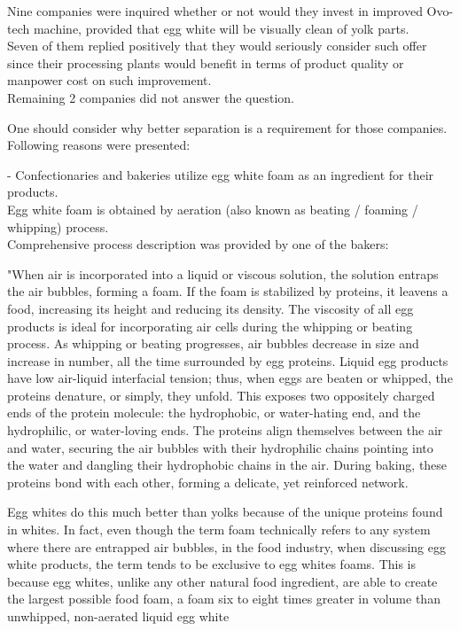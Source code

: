 \documentclass[12pt,twoside,a4paper]{article}
\begin{document}
Nine companies were inquired whether or not would they invest in improved Ovo-tech machine, provided that egg white will be visually clean of yolk parts.\\
Seven of them replied positively that they would seriously consider such offer since their processing plants would benefit in terms of product quality or manpower cost on such improvement.\\
Remaining 2 companies did not answer the question.

One should consider why better separation is a requirement for those companies.\\
Following reasons were presented:

- Confectionaries and bakeries utilize egg white foam as an ingredient for their products.\\
Egg white foam is obtained by aeration (also known as beating / foaming / whipping) process.\\
Comprehensive process description was provided by one of the bakers:

"When air is incorporated into a liquid or viscous solution, the solution entraps the air bubbles, forming a foam. If the foam is stabilized by proteins, it leavens a food, increasing its height and reducing its density. The viscosity of all egg products is ideal for incorporating air cells during the whipping or beating process. As whipping or beating progresses, air bubbles decrease in size and increase in number, all the time surrounded by egg proteins. Liquid egg products have low air-liquid interfacial tension; thus, when eggs are beaten or whipped, the proteins denature, or simply, they unfold. This exposes two oppositely charged ends of the protein molecule: the hydrophobic, or water-hating end, and the hydrophilic, or water-loving ends. The proteins align themselves between the air and water, securing the air bubbles with their hydrophilic chains pointing into the water and dangling their hydrophobic chains in the air. During baking, these proteins bond with each other, forming a delicate, yet reinforced network.

Egg whites do this much better than yolks because of the unique proteins found in whites. In fact, even though the term foam technically refers to any system where there are entrapped air bubbles, in the food industry, when discussing egg white products, the term tends to be exclusive to egg whites foams. This is because egg whites, unlike any other natural food ingredient, are able to create the largest possible food foam, a foam six to eight times greater in volume than unwhipped, non-aerated liquid egg white
\end{document}
